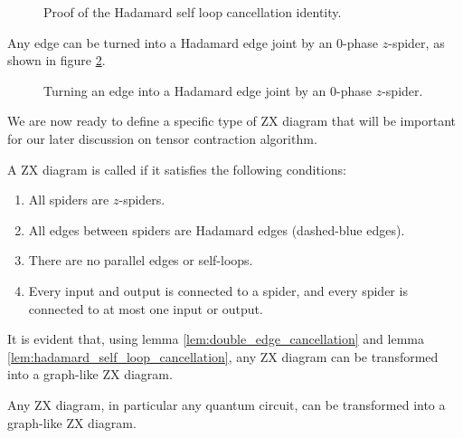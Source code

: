 \begin{figure}[ht]
	\centering
	\resizebox{0.8\linewidth}{!}{
		
	}
	\caption{Proof of the Hadamard self loop cancellation identity.}
	\label{fig:hadamard_self_loop_cancellation}
\end{figure}

\begin{lemma}\label{lem:turning_edge_to_hadamard_edge}
	Any edge can be turned into a Hadamard edge joint by an 0-phase $z$-spider, as shown in figure \ref{fig:turning_edge_to_hadamard_edge}.
\end{lemma}

\begin{figure}[ht]
	\centering
	\resizebox{0.8\linewidth}{!}{
		
	}
	\caption{Turning an edge into a Hadamard edge joint by an 0-phase $z$-spider.}
	\label{fig:turning_edge_to_hadamard_edge}
\end{figure}

We are now ready to define a specific type of ZX diagram that will be important for our later discussion on tensor contraction algorithm.

\begin{definition}
	A ZX diagram is called  if it satisfies the following conditions:
	\begin{enumerate}
		\item All spiders are $z$-spiders.
		\item All edges between spiders are Hadamard edges (dashed-blue edges).
		\item There are no parallel edges or self-loops.
		\item Every input and output is connected to a spider, and every spider is connected to at most one input or output. \end{enumerate}
\end{definition}

It is evident that, using lemma \ref{lem:double_edge_cancellation} and lemma \ref{lem:hadamard_self_loop_cancellation}, any ZX diagram can be transformed into a graph-like ZX diagram.

\begin{theorem}
	Any ZX diagram, in particular any quantum circuit, can be transformed into a graph-like ZX diagram.
\end{theorem}

